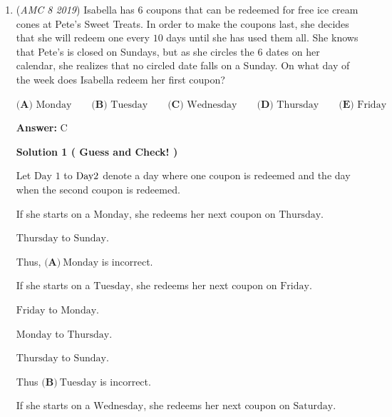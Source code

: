\begin{enumerate}
 



\textbf{Solution 4 (Different from solutions 1, 2 and 3)}

Two digit palindromes are two digit multiples of 11. When we take $33 \times 3$, we get 99, therefore 4 numbers that work for this would be $33, 33, 33$ and $11$. To convert this into three numbers, we can subtract $11$ from the first $33$, then add both $11$s to the last $33$ to get the set $22, 33$ and $55$. $22+33+55 = 110$ and $1+1+0 = \boxed{\textbf{(A) }2}$.

 


	\item (\textit{AMC 8 2019}) Isabella has $6$ coupons that can be redeemed for free ice cream cones at Pete's Sweet Treats. In order to make the coupons last, she decides that she will redeem one every $10$ days until she has used them all. She knows that Pete's is closed on Sundays, but as she circles the $6$ dates on her calendar, she realizes that no circled date falls on a Sunday. On what day of the week does Isabella redeem her first coupon?


 $\textbf{(A) }\text{Monday}\qquad\textbf{(B) }\text{Tuesday}\qquad\textbf{(C) }\text{Wednesday}\qquad\textbf{(D) }\text{Thursday}\qquad\textbf{(E) }\text{Friday}$

 \textbf{Answer: }C



\textbf{Solution 1 ( Guess and Check! )}

Let $\text{Day }1$ to $\text{Day\\ }2$ denote a day where one coupon is redeemed and the day when the second coupon is redeemed. 

 If she starts on a $\text{Monday}$, she redeems her next coupon on $\text{Thursday}$. 

 $\text{Thursday}$ to $\text{Sunday}$.

 Thus, $\textbf{(A)}\ \text{Monday}$ is incorrect.

 
If she starts on a $\text{Tuesday}$, she redeems her next coupon on $\text{Friday}$.

 $\text{Friday}$ to $\text{Monday}$.

 $\text{Monday}$ to $\text{Thursday}$.

 $\text{Thursday}$ to $\text{Sunday}$.

 Thus $\textbf{(B)}\ \text{Tuesday}$ is incorrect.

 
If she starts on a $\text{Wednesday}$, she redeems her next coupon on $\text{Saturday}$.


\end{enumerate}
